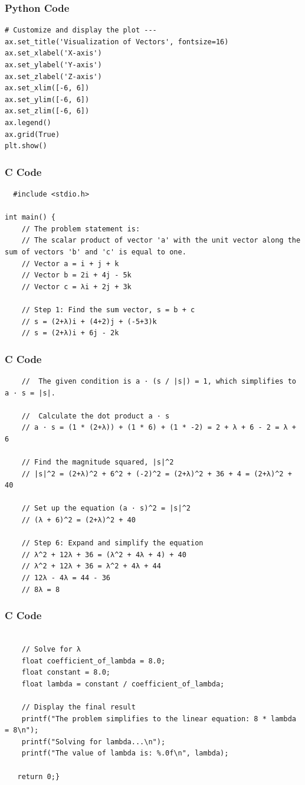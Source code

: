\documentclass{beamer}
\begin{document}
 
\begin{frame}[fragile]
    \frametitle{Python Code}

    \begin{lstlisting}
# Customize and display the plot ---
ax.set_title('Visualization of Vectors', fontsize=16)
ax.set_xlabel('X-axis')
ax.set_ylabel('Y-axis')
ax.set_zlabel('Z-axis')
ax.set_xlim([-6, 6])
ax.set_ylim([-6, 6])
ax.set_zlim([-6, 6])
ax.legend()
ax.grid(True)
plt.show()
\end{lstlisting}
\end{frame}

\begin{frame}[fragile]
\frametitle{C Code}
\begin{lstlisting}
  #include <stdio.h>

int main() {
    // The problem statement is:
    // The scalar product of vector 'a' with the unit vector along the sum of vectors 'b' and 'c' is equal to one.
    // Vector a = i + j + k
    // Vector b = 2i + 4j - 5k
    // Vector c = λi + 2j + 3k

    // Step 1: Find the sum vector, s = b + c
    // s = (2+λ)i + (4+2)j + (-5+3)k
    // s = (2+λ)i + 6j - 2k
\end{lstlisting}

\end{frame}
\begin{frame}[fragile]
\frametitle{C Code}
\begin{lstlisting}
    //  The given condition is a · (s / |s|) = 1, which simplifies to a · s = |s|.
    
    //  Calculate the dot product a · s
    // a · s = (1 * (2+λ)) + (1 * 6) + (1 * -2) = 2 + λ + 6 - 2 = λ + 6

    // Find the magnitude squared, |s|^2
    // |s|^2 = (2+λ)^2 + 6^2 + (-2)^2 = (2+λ)^2 + 36 + 4 = (2+λ)^2 + 40

    // Set up the equation (a · s)^2 = |s|^2
    // (λ + 6)^2 = (2+λ)^2 + 40

    // Step 6: Expand and simplify the equation
    // λ^2 + 12λ + 36 = (λ^2 + 4λ + 4) + 40
    // λ^2 + 12λ + 36 = λ^2 + 4λ + 44
    // 12λ - 4λ = 44 - 36
    // 8λ = 8
\end{lstlisting}
\end{frame}
\begin{frame}[fragile]
\frametitle{C Code}
\begin{lstlisting}

    // Solve for λ
    float coefficient_of_lambda = 8.0;
    float constant = 8.0;
    float lambda = constant / coefficient_of_lambda;

    // Display the final result
    printf("The problem simplifies to the linear equation: 8 * lambda = 8\n");
    printf("Solving for lambda...\n");
    printf("The value of lambda is: %.0f\n", lambda);

   return 0;}
\end{lstlisting}

\end{frame}
\end{document}
